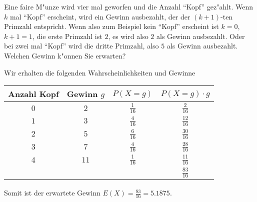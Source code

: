 Eine faire M"unze wird vier mal geworfen und die Anzahl ``Kopf'' gez"ahlt.
Wenn $k$ mal ``Kopf'' erscheint, wird ein Gewinn ausbezahlt, der der $(k+1)$-ten
Primzahl entspricht. Wenn also zum Beispiel kein ``Kopf'' erscheint ist $k=0$,
$k+1=1$, die erste Primzahl ist $2$, es wird also $2$ als Gewinn ausbezahlt. 
Oder bei zwei mal ``Kopf'' wird die dritte Primzahl, also $5$ als Gewinn
ausbezahlt.
Welchen Gewinn k"onnen Sie erwarten?

\begin{loesung}
Wir erhalten die folgenden Wahrscheinlichkeiten und Gewinne
\begin{center}
\begin{tabular}{|c|c|c|c|}
\hline
Anzahl Kopf&Gewinn $g$&$P(X=g)$&$P(X=g)\cdot g$\\
\hline
$0$&$2$&$\frac1{16}$&$\frac2{16}$\\
$1$&$3$&$\frac4{16}$&$\frac{12}{16}$\\
$2$&$5$&$\frac6{16}$&$\frac{30}{16}$\\
$3$&$7$&$\frac4{16}$&$\frac{28}{16}$\\
$4$&$11$&$\frac1{16}$&$\frac{11}{16}$\\
\hline
&&&$\frac{83}{16}$\\
\hline
\end{tabular}
\end{center}
Somit ist der erwartete Gewinn $E(X)=\frac{83}{16}=5.1875$.
\end{loesung}

